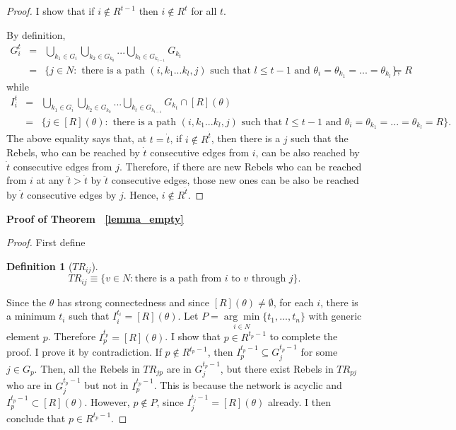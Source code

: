 \documentclass[12pt,letter]{article}
\newtheorem*{lemma*}{Lemma}
\newtheorem{definition}{Definition}[section]
\theoremstyle{definition}
\theoremstyle{remark}
\theoremstyle{claim}
\begin{document}
\begin{proof}
I show that if $i\notin R^{t-1}$ then $i\notin R^t$ for all $t$. 

By definition, 
\begin{eqnarray*}
G^t_i & = & \bigcup_{k_1\in G_i}\bigcup_{k_2\in G_{k_0}}...\bigcup_{k_{t}\in G_{k_{t-1}}}G_{k_{t}}\\
&= & \{j\in N: \text{ there is a path $(i,k_1...k_{l},j)$ such that $l\leq t-1$ and $\theta_i=\theta_{k_1}=...=\theta_{k_l}=R$}\},
\end{eqnarray*}
while
\begin{eqnarray*}
I^t_i & = & \bigcup_{k_1\in G_i}\bigcup_{k_2\in G_{k_0}}...\bigcup_{k_{t}\in G_{k_{t-1}}}G_{k_{t}}\cap [R](\theta)\\
&= & \{j\in [R](\theta): \text{ there is a path $(i,k_1...k_{l},j)$ such that $l\leq t-1$ and $\theta_i=\theta_{k_1}=...=\theta_{k_l}=R$}\}.
\end{eqnarray*}
The above equality says that, at $t=\dot{t}$, if $i\notin R^{\dot{t}}$, then there is a $j$ such that the Rebels, who can be reached by $\dot{t}$ consecutive edges from $i$, can be also reached by $\dot{t}$ consecutive edges from $j$. Therefore, if there are new Rebels who can be reached from $i$ at any $\ddot{t}>\dot{t}$ by $\ddot{t}$ consecutive edges, those new ones can be also be reached by $\ddot{t}$ consecutive edges by $j$. Hence, $i\notin R^{\ddot{t}}$. 
\end{proof}



%
\bigskip
\noindent\textbf{Proof of Theorem ~\ref{lemma_empty}}
\begin{proof}
First define
\begin{definition}[$TR_{ij}$]
\[TR_{ij}\equiv \{v\in N:\text{there is a path from $i$ to $v$ through $j$}\}.\]
\end{definition}


Since the $\theta$ has strong connectedness and since $[R](\theta)\neq \emptyset$, for each $i$, there is a minimum $t_i$ such that $I^{t_i}_i=[R](\theta)$. Let $P=\underset{i\in N}{\arg\min}\{t_1,...,t_n\}$ with generic element $p$. Therefore $I^{t_p}_p=[R](\theta)$. I show that $p\in R^{t_p-1}$ to complete the proof. I prove it by contradiction. If $p\notin R^{t_p-1}$, then $I^{t_p-1}_p\subseteq G^{t_p-1}_j$ for some $j\in G_p$. Then, all the Rebels in $TR_{jp}$ are in $G^{t_p-1}_j$, but there exist Rebels in $TR_{pj}$ who are in $G^{t_p-1}_j$ but not in $I^{t_p-1}_p$. This is because the network is acyclic and $I^{t_p-1}_p\subset [R](\theta)$. However, $p\notin P$, since $I^{t_j-1}_j=[R](\theta)$ already. I then conclude that $p\in R^{t_p-1}$.

\end{proof}
\end{document}
